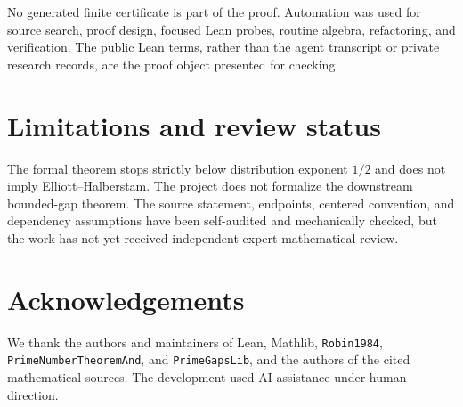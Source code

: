 \documentclass[11pt]{amsart}
\theoremstyle{definition}
\theoremstyle{remark}
\begin{document}
No generated finite certificate is part of the proof. Automation was used for
source search, proof design, focused Lean probes, routine algebra, refactoring,
and verification. The public Lean terms, rather than the agent transcript or
private research records, are the proof object presented for checking.

\section{Limitations and review status}

The formal theorem stops strictly below distribution exponent $1/2$ and does
not imply Elliott--Halberstam. The project does not formalize the downstream
bounded-gap theorem. The source statement, endpoints, centered convention,
and dependency assumptions have been self-audited and mechanically checked,
but the work has not yet received independent expert mathematical review.

\section*{Acknowledgements}

We thank the authors and maintainers of Lean, Mathlib, \texttt{Robin1984},
\texttt{PrimeNumberTheoremAnd}, and \texttt{PrimeGapsLib}, and the authors
of the cited mathematical sources. The development used AI assistance under
human direction.
\end{document}
